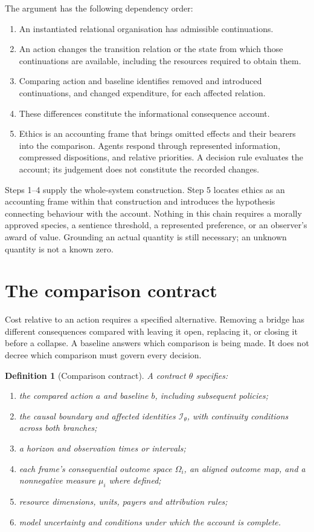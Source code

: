\documentclass[11pt,a4paper]{article}
\newtheorem{definition}{Definition}[section]
\theoremstyle{remark}
\newcommand{\I}{\mathcal I}
\begin{document}
The argument has the following dependency order:
\begin{enumerate}[leftmargin=*]
\item An instantiated relational organisation has admissible continuations.
\item An action changes the transition relation or the state from which those
continuations are available, including the resources required to obtain them.
\item Comparing action and baseline identifies removed and introduced
continuations, and changed expenditure, for each affected relation.
\item These differences constitute the informational consequence account.
\item Ethics is an accounting frame that brings omitted effects and their
bearers into the comparison. Agents respond through represented information,
compressed dispositions, and relative priorities. A decision rule evaluates
the account; its judgement does not constitute the recorded changes.
\end{enumerate}
Steps 1--4 supply the whole-system construction. Step 5 locates ethics as an
accounting frame within that construction and introduces the hypothesis
connecting behaviour with the account.
Nothing in this chain requires a morally approved species, a sentience threshold,
a represented preference, or an observer's award of value. Grounding an actual
quantity is still necessary; an unknown quantity is not a known zero.

\section{The comparison contract}\label{sec:contract}

Cost relative to an action requires a specified alternative. Removing a bridge
has different consequences compared with leaving it open, replacing it, or
closing it before a collapse. A baseline answers which comparison is being
made. It does not decree which comparison must govern every decision.

\begin{definition}[Comparison contract]\label{def:contract}
A contract $\theta$ specifies:
\begin{enumerate}[leftmargin=*]
\item the compared action $a$ and baseline $b$, including subsequent policies;
\item the causal boundary and affected identities $\I_\theta$, with continuity
conditions across both branches;
\item a horizon and observation times or intervals;
\item each frame's consequential outcome space $\Omega_i$, an aligned outcome
map, and a nonnegative measure $\mu_i$ where defined;
\item resource dimensions, units, payers and attribution rules;
\item model uncertainty and conditions under which the account is complete.
\end{enumerate}
\end{definition}
\end{document}
